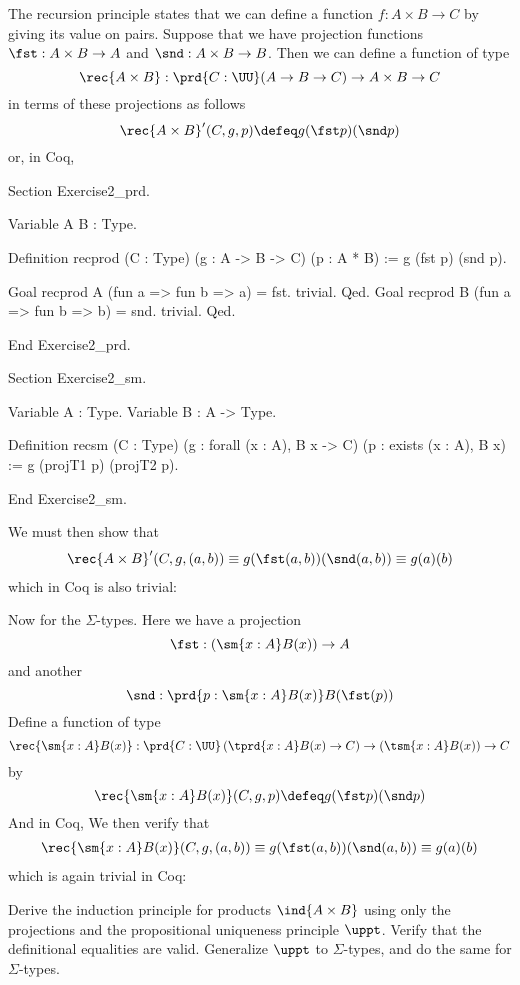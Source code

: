 \soln The recursion principle states that we can define a function $f : A
\times B \to C$ by giving its value on pairs.  Suppose that we have projection
functions $\fst : A \times B \to A$ and $\snd : A \times B \to B$.  Then we can
define a function of type
\[
  \rec{A\times B} : \prd{C : \UU} (A \to B \to C) \to A \times B \to C
\]
in terms of these projections as follows
\[
  \rec{A \times B}'(C, g, p) \defeq 
  g(\fst p)(\snd p)
\]
or, in Coq,

\nwenddocs{}\plusendmoddef
Section Exercise2_prd.

Variable A B : Type.

Definition recprod (C : Type) (g : A -> B -> C) (p : A * B) :=
    g (fst p) (snd p).

Goal recprod A (fun a => fun b => a) = fst. trivial. Qed.
Goal recprod B (fun a => fun b => b) = snd. trivial. Qed.

End Exercise2_prd.

Section Exercise2_sm.

Variable A : Type.
Variable B : A -> Type.

Definition recsm (C : Type) (g : forall (x : A), B x -> C) (p : exists (x : A), B x) :=
    g (projT1 p) (projT2 p).

End Exercise2_sm.

\nwendcode{}We must then show that
\begin{align*}
  \rec{A\times B}'(C, g, (a, b)) 
  \equiv g(\fst (a, b))(\snd (a, b))
  \equiv g(a)(b)
\end{align*}
which in Coq is also trivial:

Now for the $\Sigma$-types.  Here we have a projection
\[
  \fst : \left(\sm{x : A} B(x) \right) \to A
\]
and another
\[
  \snd : \prd{p : \sm{x : A} B(x)} B(\fst (p))
\]
Define a function of type 
\[
  \rec{\sm{x:A}B(x)} : \prd{C:\UU} \left(\tprd{x:A} B(x) \to C \right) \to
  \left(\tsm{x:A}B(x) \right) \to C
\]
by
\[
  \rec{\sm{x:A}B(x)}(C, g, p)
  \defeq
  g(\fst p)(\snd p)
\]
And in Coq,
We then verify that
\begin{align*}
  \rec{\sm{x:A}B(x)}(C, g, (a, b))
  \equiv g(\fst (a, b))(\snd (a, b))
  \equiv g(a)(b)
\end{align*}
which is again trivial in Coq:

 Derive the induction principle for products $\ind{A \times B}$
using only the projections and the propositional uniqueness principle $\uppt$.
Verify that the definitional equalities are valid.  Generalize $\uppt$ to
$\Sigma$-types, and do the same for $\Sigma$-types.

